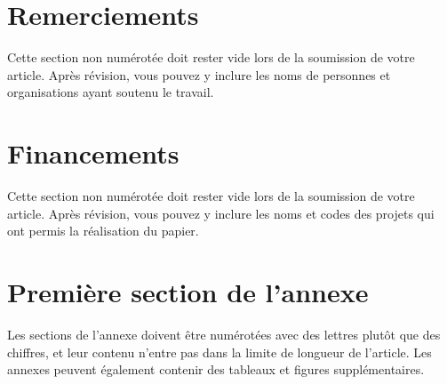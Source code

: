 \documentclass[fra]{anthology-ch}         %
\begin{document}
\section*{Remerciements}

Cette section non numérotée doit rester vide lors de la soumission de votre article. Après révision, vous pouvez y inclure les noms de personnes et organisations ayant soutenu le travail.

\section*{Financements}

Cette section non numérotée doit rester vide lors de la soumission de votre article. Après révision, vous pouvez y inclure les noms et codes des projets qui ont permis la réalisation du papier.


\printbibliography

\appendix

\section{Première section de l’annexe} \label{appdx:first}

Les sections de l’annexe doivent être numérotées avec des lettres plutôt que des chiffres, et leur contenu n’entre pas dans la limite de longueur de l’article. Les annexes peuvent également contenir des tableaux et figures supplémentaires.  
\end{document}
